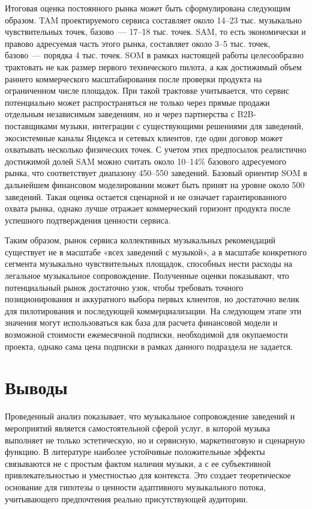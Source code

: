 Итоговая оценка постоянного рынка может быть сформулирована следующим образом. TAM проектируемого сервиса составляет около 14--23 тыс. музыкально чувствительных точек, базово~--- 17--18 тыс. точек. SAM, то есть экономически и правово адресуемая часть этого рынка, составляет около 3--5 тыс. точек, базово~--- порядка 4 тыс. точек. SOM в рамках настоящей работы целесообразно трактовать не как размер первого технического пилота, а как достижимый объем раннего коммерческого масштабирования после проверки продукта на ограниченном числе площадок. При такой трактовке учитывается, что сервис потенциально может распространяться не только через прямые продажи отдельным независимым заведениям, но и через партнерства с B2B-поставщиками музыки, интеграции с существующими решениями для заведений, экосистемные каналы Яндекса и сетевых клиентов, где один договор может охватывать несколько физических точек. С учетом этих предпосылок реалистично достижимой долей SAM можно считать около 10--14\% базового адресуемого рынка, что соответствует диапазону 450--550 заведений. Базовый ориентир SOM в дальнейшем финансовом моделировании может быть принят на уровне около 500 заведений. Такая оценка остается сценарной и не означает гарантированного охвата рынка, однако лучше отражает коммерческий горизонт продукта после успешного подтверждения ценности сервиса.

Таким образом, рынок сервиса коллективных музыкальных рекомендаций существует не в масштабе «всех заведений с музыкой», а в масштабе конкретного сегмента музыкально чувствительных площадок, способных нести расходы на легальное музыкальное сопровождение. Полученные оценки показывают, что потенциальный рынок достаточно узок, чтобы требовать точного позиционирования и аккуратного выбора первых клиентов, но достаточно велик для пилотирования и последующей коммерциализации. На следующем этапе эти значения могут использоваться как база для расчета финансовой модели и возможной стоимости ежемесячной подписки, необходимой для окупаемости проекта, однако сама цена подписки в рамках данного подраздела не задается.

\section{Выводы}
\label{sec:market:conclusion}

Проведенный анализ показывает, что музыкальное сопровождение заведений и мероприятий является самостоятельной сферой услуг, в которой музыка выполняет не только эстетическую, но и сервисную, маркетинговую и сценарную функцию. В литературе наиболее устойчивые положительные эффекты связываются не с простым фактом наличия музыки, а с ее субъективной привлекательностью и уместностью для контекста. Это создает теоретическое основание для гипотезы о ценности адаптивного музыкального потока, учитывающего предпочтения реально присутствующей аудитории.

